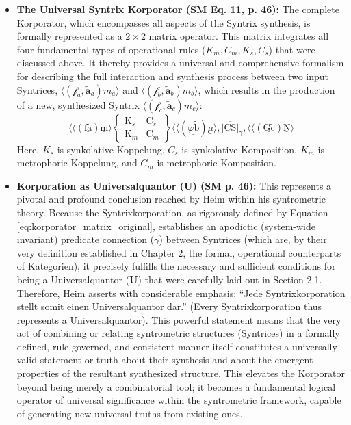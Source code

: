 \documentclass[12pt]{article}
\newcommand{\q}[1]{\enquote{#1}}
\newcommand{\metrophor}{\bm{\widetilde{a}}}
\newcommand{\synkolator}{\mathcal{f}}
\newcommand{\synkolationsstufe}{m}
\newcommand{\universalquantor}{\bm{U}}
\begin{document}
\begin{itemize}
    \item \textbf{The Universal Syntrix Korporator (SM Eq. 11, p. 46):}
    The complete Korporator, which encompasses all aspects of the Syntrix synthesis, is formally represented as a \( 2 \times 2 \) matrix operator. This matrix integrates all four fundamental types of operational rules (\( K_m, C_m, K_s, C_s \)) that were discussed above. It thereby provides a universal and comprehensive formalism for describing the full interaction and synthesis process between two input Syntrices, \( \langle(\synkolator_a,\metrophor_a)\synkolationsstufe_a\rangle \) and \( \langle(\synkolator_b,\metrophor_b)\synkolationsstufe_b\rangle \), which results in the production of a new, synthesized Syntrix \( \langle(\synkolator_c,\metrophor_c)\synkolationsstufe_c\rangle \):
    \begin{equation}
\langle\langle (\underline{\mathrm{f}\tilde{\mathrm{a}}}) \underline{\mathrm{m}} \rangle \left\{ \begin{smallmatrix} \mathrm{K}_s & \mathrm{C}_s \\ \mathrm{K}_m & \mathrm{C}_m \end{smallmatrix} \right\} \langle\langle (\underline{\varphi\tilde{\mathrm{b}}}) \underline{\mu} \rangle, \overline{|\mathrm{CS}|}_\gamma, \langle\langle (\underline{\mathrm{G}\tilde{\mathrm{c}}}) \underline{\mathrm{N}} \rangle
\label{eq:korporator_matrix_original}
\end{equation}
    Here, \(K_s\) is synkolative Koppelung, \(C_s\) is synkolative Komposition, \(K_m\) is metrophoric Koppelung, and \(C_m\) is metrophoric Komposition.

    \item \textbf{Korporation as Universalquantor (\(\universalquantor\)) (SM p. 46):}
    This represents a pivotal and profound conclusion reached by Heim within his syntrometric theory. Because the Syntrixkorporation, as rigorously defined by Equation \eqref{eq:korporator_matrix_original}, establishes an apodictic (system-wide invariant) predicate connection (\( \gamma \)) between Syntrices (which are, by their very definition established in Chapter 2, the formal, operational counterparts of Kategorien), it precisely fulfills the necessary and sufficient conditions for being a Universalquantor (\(\universalquantor\)) that were carefully laid out in Section 2.1. Therefore, Heim asserts with considerable emphasis: \q{Jede Syntrixkorporation stellt somit einen Universalquantor dar.} (Every Syntrixkorporation thus represents a Universalquantor). This powerful statement means that the very act of combining or relating syntrometric structures (Syntrices) in a formally defined, rule-governed, and consistent manner itself constitutes a universally valid statement or truth about their synthesis and about the emergent properties of the resultant synthesized structure. This elevates the Korporator beyond being merely a combinatorial tool; it becomes a fundamental logical operator of universal significance within the syntrometric framework, capable of generating new universal truths from existing ones.
\end{itemize}
\end{document}
